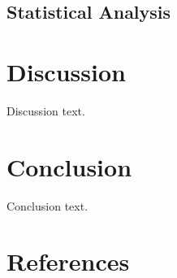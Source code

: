 \documentclass[
]{article}
\begin{document}
\subsection{Statistical Analysis}\label{statistical-analysis}

\section{Discussion}\label{discussion}

Discussion text.

\section{Conclusion}\label{conclusion}

Conclusion text.

\section*{References}\label{references}
\end{document}
